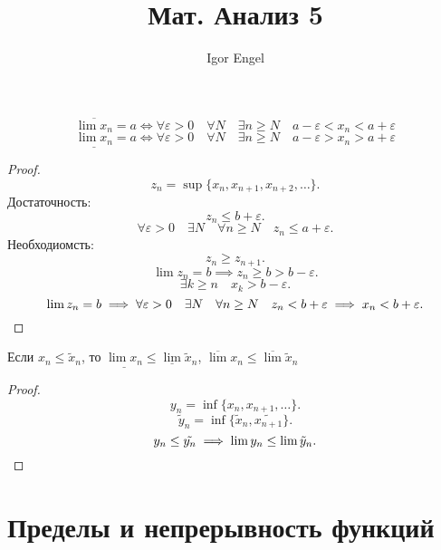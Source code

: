 \documentclass[11pt, oneside]{article}   	%
\title{Мат. Анализ 5}
\author{Igor Engel}
\date{}
\begin{document}
\maketitle
\section{}
    \begin{theorem}
        \begin{equation*}
            \overline{\lim x_n} = a
            \iff \forall{\varepsilon > 0}\quad \forall{N}\quad \exists{n \ge N}\quad  a-\varepsilon < x_n < a+\varepsilon        
        \end{equation*}
        \begin{equation*}
            \underline{\lim x_n} = a
            \iff \forall{\varepsilon > 0}\quad  \forall{N}\quad \exists{n\ge N}\quad a-\varepsilon > x_n > a+\varepsilon
        \end{equation*}
        \begin{proof}
            \[ z_n = \sup \{x_n, x_{n+1}, x_{n+2}, \ldots\}  .\]
            Достаточность:
            \[ z_n \le b+\varepsilon .\] 
            \[ \forall{\varepsilon > 0}\quad \exists{N}\quad \forall{n \ge N}\quad z_n \le a+\varepsilon .\]
            Необходиомсть:
            \[ z_n \ge z_{n+1} .\] 
            \[ \lim z_n = b \implies z_n \ge b > b-\varepsilon .\]
            \[ \exists{k\ge n}\quad x_k > b-\varepsilon .\]
            \[ \lim z_n = b \implies \forall{\varepsilon > 0}\quad \exists{N}\quad \forall{n \ge N}\quad z_n < b+\varepsilon \implies x_n < b+\varepsilon .\qedhere\] 
        \end{proof}
    \end{theorem}    
    \begin{theorem}
        Если $x_n \le \tilde{x}_n$, то $\underline{\lim x_n} \le \underline{\lim}\tilde{x}_n$, $\overline{\lim}x_n \le  \overline{\lim} \tilde{x}_n$
        \begin{proof}
            \[ y_n =\inf \{x_n, x_{n+1}, \ldots\}  .\]
            \[ \tilde{y}_n = \inf \{\tilde{x}_n, \tilde{x_{n+1}}\}  .\]
            \[ y_n \le \tilde{y_n} \implies \lim y_n \le \lim \tilde{y}_n .\qedhere\] 
        \end{proof}
    \end{theorem}
\section{Пределы и непрерывность функций}
\end{document}
